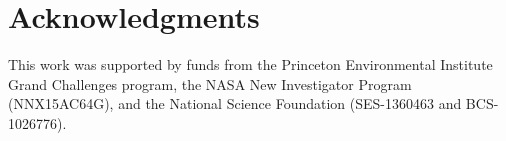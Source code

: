 \documentclass[a4paper]{article}
\begin{document}







\section*{Acknowledgments}
This work was supported by funds from the Princeton Environmental Institute Grand Challenges program, the NASA New Investigator Program (NNX15AC64G), and the National Science Foundation (SES-1360463 and BCS-1026776). 


 
{\footnotesize }

\end{document}
